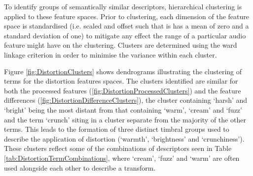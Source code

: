 		To identify groups of semantically similar descriptors, hierarchical clustering is applied to these feature
		spaces. Prior to clustering, each dimension of the feature space is standardised (i.e. scaled and offset
		such that is has a mean of zero and a standard deviation of one) to mitigate any effect the range of a
		particular audio feature might have on the clustering. Clusters are determined using the ward linkage
		criterion \citep{ward1963hierarchical} in order to minimise the variance within each cluster.

		Figure \ref{fig:DistortionClusters} shows dendrograms illustrating the clustering of terms for the
		distortion features spaces. The clusters identified are similar for both the processed features
		(\ref{fig:DistortionProcessedClusters}) and the feature differences
		(\ref{fig:DistortionDifferenceClusters}), the cluster containing `harsh' and `bright' being the most
		distant from that containing `warm', `cream' and `fuzz' and the term `crunch' siting in a cluster separate
		from the majority of the other terms. This leads to the formation of three distinct timbral groups used to
		describe the application of distortion (`warmth', `brightness' and `crunchiness'). These clusters reflect
		some of the combinations of descriptors seen in Table \ref{tab:DistortionTermCombinations}, where `cream',
		`fuzz' and `warm' are often used alongside each other to describe a transform.

